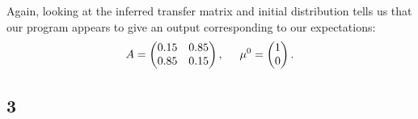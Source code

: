 \documentclass[10pt]{article}\usepackage[]{graphicx}\usepackage[]{color}
\theoremstyle{plain}
\begin{document}
Again, looking at the inferred transfer matrix and initial distribution tells us that our program appears to give an output corresponding to our expectations:  
\[
A =
\begin{pmatrix}
  0.15 & 0.85 \\ 0.85 & 0.15
\end{pmatrix},\hspace{.5cm} 
\mu^0 =
\begin{pmatrix}
  1 \\ 0
\end{pmatrix}.
\]

\subsection*{3}
\end{document}

